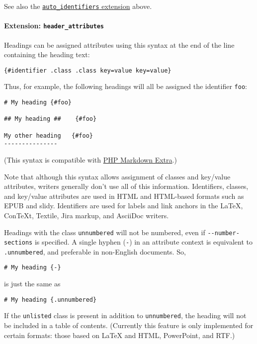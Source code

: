 \documentclass[
  a4paper,
]{article}
\begin{document}
See also the
\protect\hyperlink{extension-auto_identifiers}{\texttt{auto\_identifiers}
extension} above.

\hypertarget{extension-header_attributes}{%
\paragraph{\texorpdfstring{Extension:
\texttt{header\_attributes}}{Extension: header\_attributes}}\label{extension-header_attributes}}

Headings can be assigned attributes using this syntax at the end of the
line containing the heading text:

\begin{verbatim}
{#identifier .class .class key=value key=value}
\end{verbatim}

Thus, for example, the following headings will all be assigned the
identifier \texttt{foo}:

\begin{verbatim}
# My heading {#foo}

## My heading ##    {#foo}

My other heading   {#foo}
---------------
\end{verbatim}

(This syntax is compatible with
\href{https://michelf.ca/projects/php-markdown/extra/}{PHP Markdown
Extra}.)

Note that although this syntax allows assignment of classes and
key/value attributes, writers generally don't use all of this
information. Identifiers, classes, and key/value attributes are used in
HTML and HTML-based formats such as EPUB and slidy. Identifiers are used
for labels and link anchors in the LaTeX, ConTeXt, Textile, Jira markup,
and AsciiDoc writers.

Headings with the class \texttt{unnumbered} will not be numbered, even
if \texttt{-\/-number-sections} is specified. A single hyphen
(\texttt{-}) in an attribute context is equivalent to
\texttt{.unnumbered}, and preferable in non-English documents. So,

\begin{verbatim}
# My heading {-}
\end{verbatim}

is just the same as

\begin{verbatim}
# My heading {.unnumbered}
\end{verbatim}

If the \texttt{unlisted} class is present in addition to
\texttt{unnumbered}, the heading will not be included in a table of
contents. (Currently this feature is only implemented for certain
formats: those based on LaTeX and HTML, PowerPoint, and RTF.)
\end{document}
